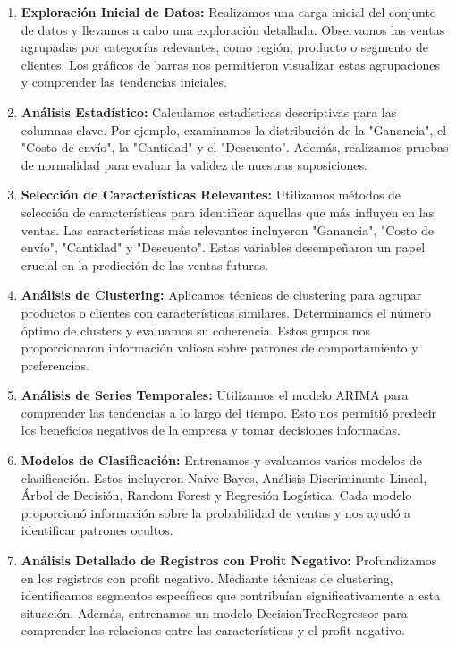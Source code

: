 \documentclass[preprint,12pt]{elsarticle}
\begin{document}
\begin{enumerate}
    \item \textbf{Exploración Inicial de Datos:} Realizamos una carga inicial del conjunto de datos y llevamos a cabo una exploración detallada. Observamos las ventas agrupadas por categorías relevantes, como región, producto o segmento de clientes. Los gráficos de barras nos permitieron visualizar estas agrupaciones y comprender las tendencias iniciales.
    \item \textbf{Análisis Estadístico:} Calculamos estadísticas descriptivas para las columnas clave. Por ejemplo, examinamos la distribución de la "Ganancia", el "Costo de envío", la "Cantidad" y el "Descuento". Además, realizamos pruebas de normalidad para evaluar la validez de nuestras suposiciones.
    \item \textbf{Selección de Características Relevantes:} Utilizamos métodos de selección de características para identificar aquellas que más influyen en las ventas. Las características más relevantes incluyeron "Ganancia", "Costo de envío", "Cantidad" y "Descuento". Estas variables desempeñaron un papel crucial en la predicción de las ventas futuras.
    \item \textbf{Análisis de Clustering:} Aplicamos técnicas de clustering para agrupar productos o clientes con características similares. Determinamos el número óptimo de clusters y evaluamos su coherencia. Estos grupos nos proporcionaron información valiosa sobre patrones de comportamiento y preferencias.
    \item \textbf{Análisis de Series Temporales:} Utilizamos el modelo ARIMA para comprender las tendencias a lo largo del tiempo. Esto nos permitió predecir los beneficios negativos de la empresa y tomar decisiones informadas.
    \item \textbf{Modelos de Clasificación:} Entrenamos y evaluamos varios modelos de clasificación. Estos incluyeron Naive Bayes, Análisis Discriminante Lineal, Árbol de Decisión, Random Forest y Regresión Logística. Cada modelo proporcionó información sobre la probabilidad de ventas y nos ayudó a identificar patrones ocultos.
    \item \textbf{Análisis Detallado de Registros con Profit Negativo:} Profundizamos en los registros con profit negativo. Mediante técnicas de clustering, identificamos segmentos específicos que contribuían significativamente a esta situación. Además, entrenamos un modelo DecisionTreeRegressor para comprender las relaciones entre las características y el profit negativo.
\end{enumerate}
\end{document}
